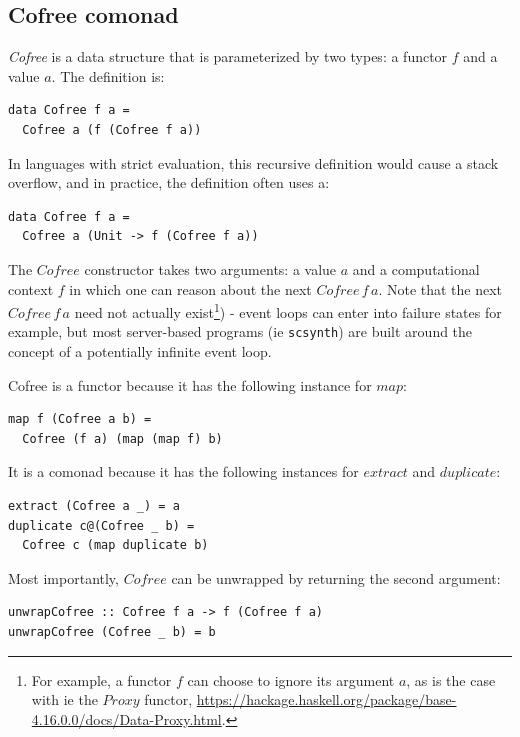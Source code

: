 \documentclass{article}
\begin{document}
\subsection{Cofree comonad}

\textit{Cofree} is a data structure that is parameterized by two types: a functor $f$ and a value $a$. The definition is:

\lstset{language=Haskell, style=psstyle}
\begin{lstlisting}
data Cofree f a =
  Cofree a (f (Cofree f a))
\end{lstlisting}

In languages with strict evaluation, this recursive definition would cause a stack overflow, and in practice, the definition often uses a:

\lstset{language=Haskell, style=psstyle}
\begin{lstlisting}
data Cofree f a =
  Cofree a (Unit -> f (Cofree f a))
\end{lstlisting}

The $Cofree$ constructor takes two arguments: a value $a$ and a computational context $f$ in which one can reason about the next $Cofree\,f\,a$. Note that the next $Cofree\,f\,a$ need not actually exist\footnote{For example, a functor $f$ can choose to ignore its argument $a$, as is the case with ie the $Proxy$ functor, \url{https://hackage.haskell.org/package/base-4.16.0.0/docs/Data-Proxy.html}.}) - event loops can enter into failure states for example, but most server-based programs (ie \texttt{scsynth}) are built around the concept of a potentially infinite event loop.

Cofree is a functor because it has the following instance for $map$:

\lstset{language=Haskell, style=psstyle}
\begin{lstlisting}
map f (Cofree a b) =
  Cofree (f a) (map (map f) b)
\end{lstlisting}

It is a comonad because it has the following instances for $extract$ and $duplicate$:

\lstset{language=Haskell, style=psstyle}
\begin{lstlisting}
extract (Cofree a _) = a
duplicate c@(Cofree _ b) =
  Cofree c (map duplicate b)
\end{lstlisting}

Most importantly, $Cofree$ can be unwrapped by returning the second argument:

\lstset{language=Haskell, style=psstyle}
\begin{lstlisting}
unwrapCofree :: Cofree f a -> f (Cofree f a)
unwrapCofree (Cofree _ b) = b
\end{lstlisting}
\end{document}
